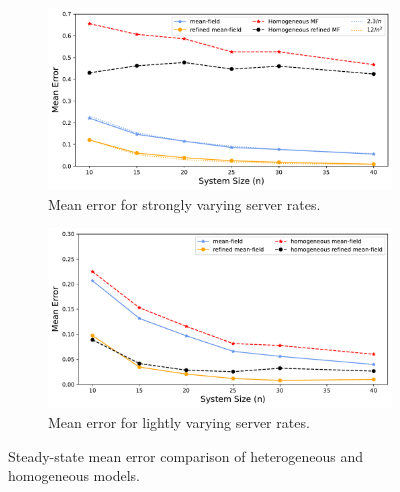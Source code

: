 \documentclass[acmsmall]{acmart}
\begin{document}
\begin{figure}[ht]
\begin{subfigure}[b]{0.47\linewidth}
  \includegraphics[width=\linewidth]{average_error_comparison}
  \caption{Mean error for strongly varying server rates.}
  \label{fig:mean_error_comp_het_vs_hom_large_server_var}
\end{subfigure}
\hfill
\begin{subfigure}[b]{0.47\linewidth}
  \includegraphics[width=\linewidth]{average_error_comparison_uniform}
  \caption{Mean error for lightly varying server rates.}
  \label{fig:mean_error_comp_het_vs_hom_small_server_var}
\end{subfigure}
\caption{Steady-state mean error comparison of heterogeneous and homogeneous models.}
\label{fig:mean_error_comp_het_vs_hom}
\end{figure}
\end{document}
